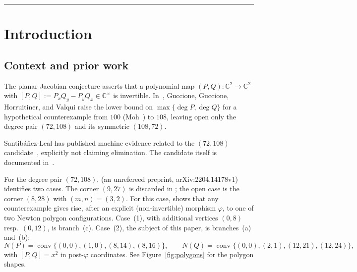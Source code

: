 \documentclass[a4paper,11pt]{article}
\theoremstyle{plain}
\theoremstyle{definition}
\theoremstyle{remark}
\begin{document}
\begin{abstract}
Hence no polynomials $P,Q$ satisfying $\mathrm{NewtonNF2}$ have $[P,Q]=\lambda x^2$ with $\lambda\neq0$ (Theorem~\ref{thm:main}). In Lean this NewtonNF2 form is a single unconditional kernel-checked theorem, \texttt{main\_theorem}, on the standard axioms only. Its top-layer input is \texttt{chartClassification\_holds}, a formalized algebraic proof of the $m=7$ top-layer classification of Proposition~\ref{prop:top-class}, in the normalized chart (\S\ref{sec:chartproof}). The $a_{8,16}=0$ part is computer algebra. The application to the Jacobian conjecture is conditional on the correctness and exhaustiveness of~\cite[Proposition~4.3]{GGHV} (Corollary~\ref{cor:gghv}).
\end{abstract}

\vspace{1.2cm}
\hrule
\vspace{1.4cm}

\tableofcontents
\newpage

\section{Introduction}

\subsection{Context and prior work}

The planar Jacobian conjecture asserts that a polynomial map $(P,Q):\mathbb{C}^2\to\mathbb{C}^2$ with $[P,Q]:=P_xQ_y-P_yQ_x\in\mathbb{C}^\times$ is invertible. In~\cite{GGHV}, Guccione, Guccione, Horruitiner, and Valqui raise the lower bound on $\max\{\deg P,\deg Q\}$ for a hypothetical counterexample from $100$ (Moh~\cite{Moh}) to $108$, leaving open only the degree pair $(72,108)$ and its symmetric $(108,72)$.

Santib\'a\~nez-Leal has published machine evidence related to the $(72,108)$ candidate~\cite{Santibanez,SantibanezPaper}, explicitly not claiming elimination. The candidate itself is documented in~\cite{JC125note}.

For the degree pair $(72,108)$, \cite{GGHV} (an unrefereed preprint, arXiv:2204.14178v1) identifies two cases. The corner $(9,27)$ is discarded in \cite[\S5]{GGHV}; the open case is the corner $(8,28)$ with $(m,n)=(3,2)$. For this case, \cite[Proposition~4.3]{GGHV} shows that any counterexample gives rise, after an explicit (non-invertible) morphism $\varphi$, to one of two Newton polygon configurations. Case~(1), with additional vertices $(0,8)$ resp.\ $(0,12)$, is branch~(c). Case~(2), the subject of this paper, is branches~(a) and~(b):
\begin{equation}\label{eq:polygons}
N(P)=\operatorname{conv}\{(0,0),(1,0),(8,14),(8,16)\},\qquad
N(Q)=\operatorname{conv}\{(0,0),(2,1),(12,21),(12,24)\},
\end{equation}
with $[P,Q]=x^2$ in post-$\varphi$ coordinates. See Figure~\ref{fig:polygons} for the polygon shapes.
\end{document}
